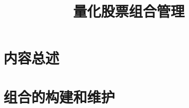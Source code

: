 \documentclass{book}
\title{量化股票组合管理}
\begin{document}
\frontmatter
\tableofcontents
\mainmatter
\part{内容总述}

\part{组合的构建和维护}
\end{document}

